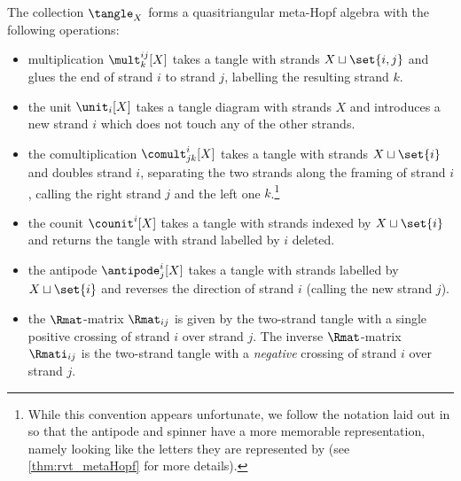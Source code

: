 \begin{theorem}
        \label{thm:vt_qtmha}
        The collection $\tangle_X$ forms a quasitriangular meta-Hopf algebra
        with the following operations:
        \begin{itemize}
                \item multiplication $\mult^{ij}_{k}[X]$ takes a tangle with
                        strands $X\sqcup\set{i,j}$ and glues the end of strand
                        $i$ to strand $j$, labelling the resulting strand $k$.
                \item the unit $\unit_{i}[X]$ takes a tangle diagram with
                        strands $X$ and introduces a new strand $i$ which does
                        not touch any of the other strands.
                \item the comultiplication $\comult^{i}_{jk}[X]$ takes a tangle
                        with strands $X\sqcup \set{i}$ and doubles strand $i$,
                        separating the two strands along the framing of strand
                        $i$, calling the right strand $j$ and the left one
                        $k$.\footnote{While this convention appears unfortunate,
                        we follow the notation laid out in \cite{BV} so that the
                        antipode and spinner have a more memorable
                        representation, namely looking like the letters they are
                        represented by (see \cref{thm:rvt_metaHopf} for more
                        details).
                }
                \item the counit $\counit^{i}[X]$ takes a tangle with strands
                        indexed by $X\sqcup \set{i}$ and returns the tangle with
                        strand labelled by $i$ deleted.
                \item the antipode $\antipode^{i}_{j}[X]$ takes a tangle with
                        strands labelled by $X \sqcup \set{i}$ and reverses the
                        direction of strand $i$ (calling the new strand $j$).
                \item the $\Rmat$-matrix $\Rmat_{ij}$ is given by the two-strand
                        tangle with a single positive crossing of strand $i$
                        over strand $j$. The inverse $\Rmat$-matrix
                        $\Rmati_{ij}$ is the two-strand tangle with a
                        \emph{negative} crossing of strand $i$ over strand $j$.
        \end{itemize}
\end{theorem}
